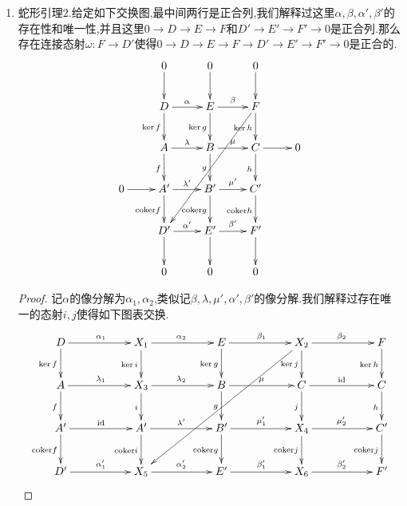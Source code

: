 \begin{enumerate}
\begin{proof}
    	现在我们来证明$\xymatrix{E\ar[r]^{\beta}&F\ar[r]^{\omega}&D'\ar[r]^{\alpha'}&E'}$是正合的.为此先证明$\omega\circ\beta=0$,为此任取$E$的伪元素$e$,那么$\alpha\omega(\beta(e))=\mathrm{coker}f(a')$,但是$\lambda'(a')=g(b)=g(\ker g(e))=0$,结合$\lambda'$是单态射得到$a'=0$,于是$\omega\circ\beta=0$.现在假设$F$的伪元素$x$满足$\omega(x)=\mathrm{coker}f(a')=0$,需要构造$E$的伪元素$e$使得$\beta(e)=x$.按照第一列的正合性,存在$A$的伪元素$a$使得$f(a)\cong a'$,于是$g(\lambda(a))=\lambda'(f(a))\cong g(b)$,于是$g(b-\lambda(a))=0$.于是存在$E$的伪元素$e$使得$\ker g(e)\cong b-\lambda(a)$.于是$\ker h(\beta(e))=\mu(\ker g(e))=\cong\mu(b-\lambda(a))\cong\mu(b)\cong\ker h(x)$,于是$\ker h$是单态射得到$\beta(e)=x$.对偶的可证明$F\to D'\to E'$也是正合的.
    \end{proof}
    \item 蛇形引理2.给定如下交换图,最中间两行是正合列,我们解释过这里$\alpha,\beta,\alpha',\beta'$的存在性和唯一性,并且这里$0\to D\to E\to F$和$D'\to E'\to F'\to0$是正合列.那么存在连接态射$\omega:F\to D'$使得$0\to D\to E\to F\to D'\to E'\to F'\to0$是正合的.
    $$\xymatrix{&0\ar[d]&0\ar[d]&0\ar[d]&\\&D\ar[r]^{\alpha}\ar[d]_{\ker f}&E\ar[r]^{\beta}\ar[d]_{\ker g}&F\ar[d]_{\ker h}\ar[dddll]&\\&A\ar[r]^{\lambda}\ar[d]_f&B\ar[r]^{\mu}\ar[d]_g&C\ar[r]\ar[d]_h&0\\0\ar[r]&A'\ar[r]^{\lambda'}\ar[d]_{\mathrm{coker}f}&B'\ar[r]^{\mu'}\ar[d]_{\mathrm{coker}g}&C'\ar[d]_{\mathrm{coker}h}&\\&D'\ar[r]^{\alpha'}\ar[d]&E'\ar[r]^{\beta'}\ar[d]&F'\ar[d]&\\&0&0&0&}$$
    \begin{proof}
    	
    	记$\alpha$的像分解为$\alpha_1,\alpha_2$,类似记$\beta,\lambda,\mu',\alpha',\beta'$的像分解.我们解释过存在唯一的态射$i,j$使得如下图表交换.
    	$$\xymatrix{D\ar[rr]^{\alpha_1}\ar[d]_{\ker f}&&X_1\ar[rr]^{\alpha_2}\ar[d]_{\ker i}&&E\ar[rr]^{\beta_1}\ar[d]_{\ker g}&&X_2\ar[dddllll]\ar[rr]^{\beta_2}\ar[d]_{\ker j}&&F\ar[d]_{\ker h}\\A\ar[rr]^{\lambda_1}\ar[d]_f&&X_3\ar[rr]^{\lambda_2}\ar[d]_i&&B\ar[rr]^{\mu}\ar[d]_g&&C\ar[rr]^{\mathrm{id}}\ar[d]_j&&C\ar[d]_h\\A'\ar[rr]^{\mathrm{id}}\ar[d]_{\mathrm{coker}f}&&A'\ar[rr]^{\lambda'}\ar[d]_{\mathrm{coker}i}&&B'\ar[rr]^{\mu'_1}\ar[d]_{\mathrm{coker}g}&&X_4\ar[rr]^{\mu'_2}\ar[d]_{\mathrm{coker}j}&&C'\ar[d]_{\mathrm{coker}j}\\D'\ar[rr]^{\alpha'_1}&&X_5\ar[rr]^{\alpha_2'}&&E'\ar[rr]^{\beta_1'}&&X_6\ar[rr]^{\beta'_2}&&F'}$$
    	

\end{proof}
\end{enumerate}

